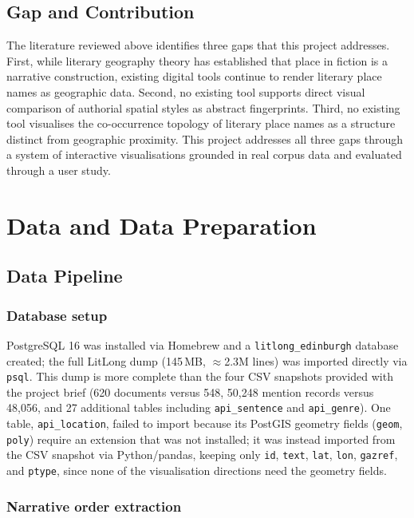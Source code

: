 \documentclass[logo,msc]{infthesis}
\begin{document}
\section{Gap and Contribution}
 
The literature reviewed above identifies three gaps that this project addresses. First, while literary geography theory has established that place in fiction is a narrative construction, existing digital tools continue to render literary place names as geographic data. Second, no existing tool supports direct visual comparison of authorial spatial styles as abstract fingerprints. Third, no existing tool visualises the co-occurrence topology of literary place names as a structure distinct from geographic proximity. This project addresses all three gaps through a system of interactive visualisations grounded in real corpus data and evaluated through a user study.

\chapter{Data and Data Preparation}
\label{chap:data}
 
\section{Data Pipeline}
 
\subsection*{Database setup}
 
PostgreSQL 16 was installed via Homebrew and a \texttt{litlong\_edinburgh} database created; the full LitLong dump (145\,MB, $\approx$2.3M lines) was imported directly via \texttt{psql}. This dump is more complete than the four CSV snapshots provided with the project brief (620 documents versus 548, 50,248 mention records versus 48,056, and 27 additional tables including \texttt{api\_sentence} and \texttt{api\_genre}). One table, \texttt{api\_location}, failed to import because its PostGIS geometry fields (\texttt{geom}, \texttt{poly}) require an extension that was not installed; it was instead imported from the CSV snapshot via Python/pandas, keeping only \texttt{id}, \texttt{text}, \texttt{lat}, \texttt{lon}, \texttt{gazref}, and \texttt{ptype}, since none of the visualisation directions need the geometry fields.

\subsection*{Narrative order extraction}
\end{document}
